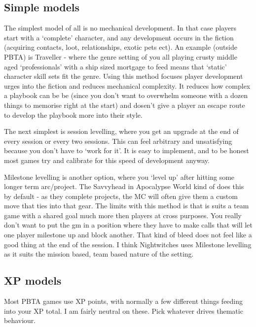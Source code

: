 \documentclass{tufte-handout}
\begin{document}
\subsection{Simple models}
The simplest model of all is no mechanical development. In that case players start with a `complete' character, and any development occurs in the fiction (acquiring contacts, loot, relationships, exotic pets ect). An example (outside PBTA) is Traveller - where the genre setting of you all playing crusty middle aged `professionals' with a ship sized mortgage to feed means that `static' character skill sets fit the genre. Using this method  focuses player development urges into the fiction and reduces mechanical complexity. It reduces how complex a playbook can be be (since you don't want to overwhelm someone with a dozen things to memorise right at the start) and dosen't give a player an escape route to develop the playbook more into their style. 

The next simplest is session levelling, where you get an upgrade at the end of every session or every two sessions. This can feel arbitrary and unsatisfying because you don't have to `work for it'. It is easy to implement, and to be honest most games try and calibrate for this speed of development anyway. 

Milestone levelling is another option, where you `level up' after hitting some longer term arc/project. The Savvyhead in Apocalypse World kind of does this by default - as they complete projects, the MC will often give them a custom move that ties into that gear. The limits with this method is that is suits a team game with a shared goal much more then players at cross purposes. You really don't want to put the gm in a position where they have to make calls that will let one player milestone up and block another. That kind of bleed does not feel like a good thing at the end of the session.  I think Nightwitches uses Milestone levelling as it suits the mission based, team based nature of the setting.

\subsection{XP models}
Most PBTA games use XP points, with normally a few different things feeding into your XP total. I am fairly neutral on these. Pick whatever drives thematic behaviour.
\end{document}
